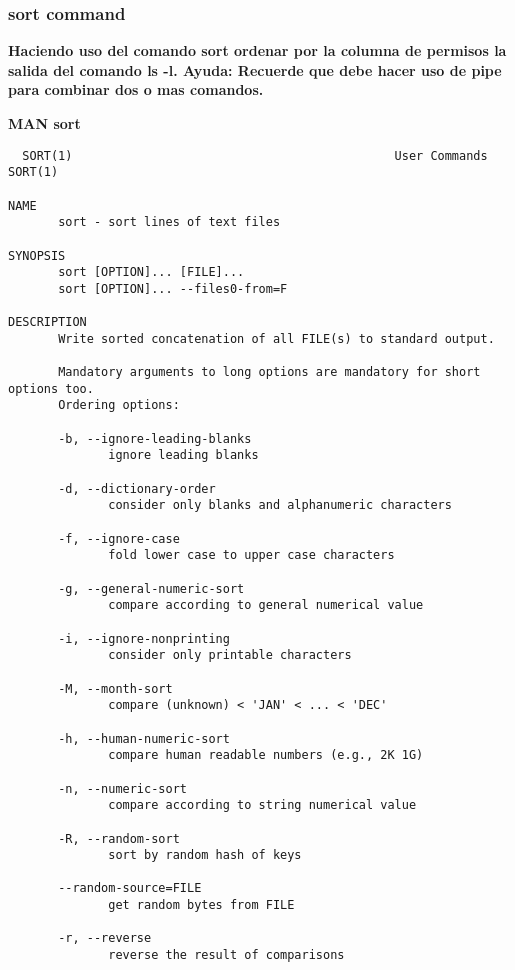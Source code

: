 \documentclass[a4paper,11pt,spanish]{article} %
\newenvironment{myscriptlisting}
{\begin{list}{}{\setlength{\leftmargin}{1em}}\item\scriptsize\bfseries}
{\end{list}}
\begin{document}
\subsubsection{sort command}

\textbf{Haciendo uso del comando sort ordenar por la columna de permisos la salida del comando ls -l. 
Ayuda: Recuerde que debe hacer uso de pipe para combinar dos o mas comandos.}

\textbf{MAN sort}

\begin{myscriptlisting}
 \begin{verbatim}
  SORT(1)                                             User Commands                                             SORT(1)

NAME
       sort - sort lines of text files

SYNOPSIS
       sort [OPTION]... [FILE]...
       sort [OPTION]... --files0-from=F

DESCRIPTION
       Write sorted concatenation of all FILE(s) to standard output.

       Mandatory arguments to long options are mandatory for short options too.  
       Ordering options:

       -b, --ignore-leading-blanks
              ignore leading blanks

       -d, --dictionary-order
              consider only blanks and alphanumeric characters

       -f, --ignore-case
              fold lower case to upper case characters

       -g, --general-numeric-sort
              compare according to general numerical value

       -i, --ignore-nonprinting
              consider only printable characters

       -M, --month-sort
              compare (unknown) < 'JAN' < ... < 'DEC'

       -h, --human-numeric-sort
              compare human readable numbers (e.g., 2K 1G)

       -n, --numeric-sort
              compare according to string numerical value

       -R, --random-sort
              sort by random hash of keys

       --random-source=FILE
              get random bytes from FILE

       -r, --reverse
              reverse the result of comparisons
 \end{verbatim}
\end{myscriptlisting}
\end{document}
